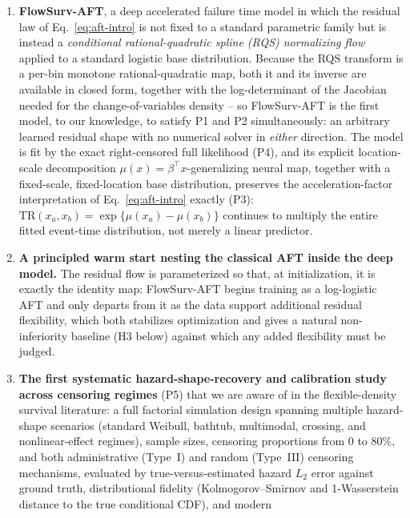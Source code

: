 \documentclass[11pt]{article}
\begin{document}
\begin{enumerate}
  \item \textbf{FlowSurv-AFT}, a deep accelerated failure time model in
    which the residual law of Eq.~\eqref{eq:aft-intro} is not fixed to a
    standard parametric family but is instead a \emph{conditional
    rational-quadratic spline (RQS) normalizing flow}
    \citep{durkan2019nsf} applied to a standard logistic base
    distribution. Because the RQS transform is a per-bin monotone
    rational-quadratic map, both it and its inverse are available in
    closed form, together with the log-determinant of the Jacobian
    needed for the change-of-variables density -- so FlowSurv-AFT is the
    first model, to our knowledge, to satisfy P1 and P2 simultaneously:
    an arbitrary learned residual shape with no numerical solver in
    \emph{either} direction. The model is fit by the exact
    right-censored full likelihood (P4), and its explicit
    location-scale decomposition $\mu(x) = \beta^\top x$-generalizing
    neural map, together with a fixed-scale, fixed-location base
    distribution, preserves the acceleration-factor interpretation of
    Eq.~\eqref{eq:aft-intro} exactly (P3): $\mathrm{TR}(x_a, x_b) =
    \exp\{\mu(x_a) - \mu(x_b)\}$ continues to multiply the entire fitted
    event-time distribution, not merely a linear predictor.
  \item \textbf{A principled warm start nesting the classical AFT inside
    the deep model.} The residual flow is parameterized so that, at
    initialization, it is exactly the identity map: FlowSurv-AFT begins
    training as a log-logistic AFT and only departs from it as the data
    support additional residual flexibility, which both stabilizes
    optimization and gives a natural non-inferiority baseline (H3 below)
    against which any added flexibility must be judged.
  \item \textbf{The first systematic hazard-shape-recovery and
    calibration study across censoring regimes} (P5) that we are aware
    of in the flexible-density survival literature: a full factorial
    simulation design spanning multiple hazard-shape scenarios (standard
    Weibull, bathtub, multimodal, crossing, and nonlinear-effect
    regimes), sample sizes, censoring proportions from 0 to 80\%, and
    both administrative (Type~I) and random (Type~III) censoring
    mechanisms, evaluated by true-versus-estimated hazard $L_2$ error
    against ground truth, distributional fidelity (Kolmogorov--Smirnov
    and 1-Wasserstein distance to the true conditional CDF), and modern

\end{enumerate}
\end{document}

